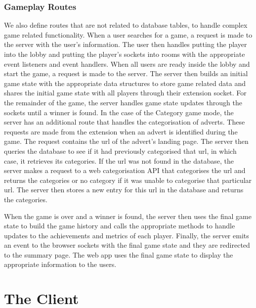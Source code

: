 \documentclass{l4proj}
\begin{document}
\subsubsection{Gameplay Routes}
We also define routes that are not related to database tables, to handle complex game related functionality. When a user searches for a game, a request is made to the server with the user's information. The user then handles putting the player into the lobby and putting the player's sockets into rooms with the appropriate event listeners and event handlers. When all users are ready inside the lobby and start the game, a request is made to the server. The server then builds an initial game state with the appropriate data structures to store game related data and shares the initial game state with all players through their extension socket. For the remainder of the game, the server handles game state updates through the sockets until a winner is found. In the case of the Category game mode, the server has an additional route that handles the categorisation of adverts. These requests are made from the extension when an advert is identified during the game. The request contains the url of the advert's landing page. The server then queries the database to see if it had previously categorised that url, in which case, it retrieves its categories. If the url was not found in the database, the server makes a request to a web categorisation API that categorises the url and returns the categories or no category if it was unable to categorise that particular url. The server then stores a new entry for this url in the database and returns the categories.

When the game is over and a winner is found, the server then uses the final game state to build the game history and calls the appropriate methods to handle updates to the achievements and metrics of each player. Finally, the server emits an event to the browser sockets with the final game state and they are redirected to the summary page. The web app uses the final game state to display the appropriate information to the users.    


\section{The Client}
\end{document}
